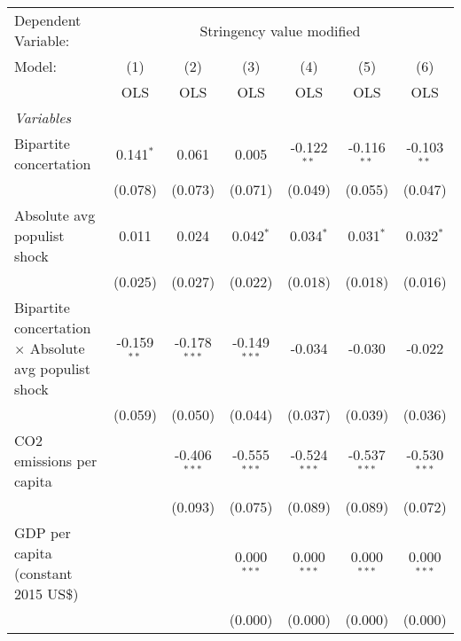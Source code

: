 
\begingroup
\centering
\begin{tabular}{lcccccc}
   \toprule
   Dependent Variable: & \multicolumn{6}{c}{Stringency value modified}\\
   Model:                                                       & (1)           & (2)            & (3)            & (4)            & (5)            & (6)\\  
                                                                &  OLS          & OLS            & OLS            & OLS            & OLS            & OLS\\  
   \midrule
   \emph{Variables}\\
   Bipartite concertation                                       & 0.141$^{*}$   & 0.061          & 0.005          & -0.122$^{**}$  & -0.116$^{**}$  & -0.103$^{**}$\\   
                                                                & (0.078)       & (0.073)        & (0.071)        & (0.049)        & (0.055)        & (0.047)\\   
   Absolute avg populist shock                                  & 0.011         & 0.024          & 0.042$^{*}$    & 0.034$^{*}$    & 0.031$^{*}$    & 0.032$^{*}$\\   
                                                                & (0.025)       & (0.027)        & (0.022)        & (0.018)        & (0.018)        & (0.016)\\   
   Bipartite concertation $\times$ Absolute avg populist shock  & -0.159$^{**}$ & -0.178$^{***}$ & -0.149$^{***}$ & -0.034         & -0.030         & -0.022\\   
                                                                & (0.059)       & (0.050)        & (0.044)        & (0.037)        & (0.039)        & (0.036)\\   
   CO2 emissions per capita                                     &               & -0.406$^{***}$ & -0.555$^{***}$ & -0.524$^{***}$ & -0.537$^{***}$ & -0.530$^{***}$\\   
                                                                &               & (0.093)        & (0.075)        & (0.089)        & (0.089)        & (0.072)\\   
   GDP per capita (constant 2015 US\$)                          &               &                & 0.000$^{***}$  & 0.000$^{***}$  & 0.000$^{***}$  & 0.000$^{***}$\\   
                                                                &               &                & (0.000)        & (0.000)        & (0.000)        & (0.000)\\   

\end{tabular}
